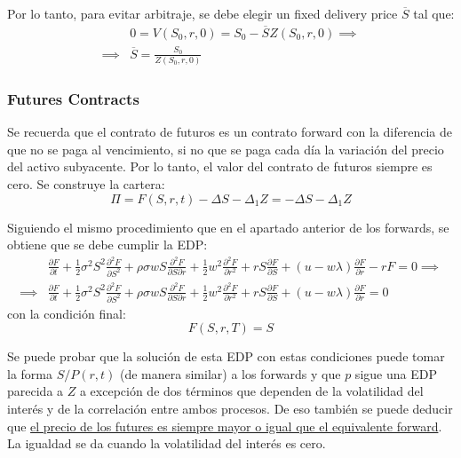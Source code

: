 Por lo tanto, para evitar arbitraje, se debe elegir un fixed delivery price $\overline{S}$ tal que:
\begin{align*}
    &0 = V(S_0,r,0) = S_0 - \overline{S} Z(S_0,r,0) \implies \\
    \implies &\boxed{\overline{S} = \frac{S_0}{Z(S_0,r,0)}}
\end{align*}





\subsubsection{Futures Contracts}
Se recuerda que el contrato de futuros es un contrato forward con la diferencia de que no se paga al vencimiento, si no que se paga cada día la variación del precio del activo subyacente. Por lo tanto, el valor del contrato de futuros siempre es cero. Se construye la cartera:
\begin{equation*}
    \Pi = F(S,r,t) - \Delta S - \Delta_1 Z = - \Delta S - \Delta_1 Z
\end{equation*}

Siguiendo el mismo procedimiento que en el apartado anterior de los forwards, se obtiene que se debe cumplir la EDP:
\begin{align*}
    &\frac{\partial F}{\partial t} + \frac{1}{2} \sigma^2 S^2 \frac{\partial^2 F}{\partial S^2} + \rho\sigma w S \frac{\partial^2 F}{\partial S \partial r} + \frac{1}{2} w^2 \frac{\partial^2 F}{\partial r^2} + rS\frac{\partial F}{\partial S} + (u - w\lambda) \frac{\partial F}{\partial r} - rF = 0 \implies \\
    \implies &\boxed{\frac{\partial F}{\partial t} + \frac{1}{2} \sigma^2 S^2 \frac{\partial^2 F}{\partial S^2} + \rho\sigma w S \frac{\partial^2 F}{\partial S \partial r} + \frac{1}{2} w^2 \frac{\partial^2 F}{\partial r^2} + rS\frac{\partial F}{\partial S} + (u - w\lambda) \frac{\partial F}{\partial r} = 0}
\end{align*}
con la condición final:
\begin{equation*}
    F(S,r,T) = S
\end{equation*}



Se puede probar que la solución de esta EDP con estas condiciones puede tomar la forma $S/P(r,t)$ (de manera similar) a los forwards y que $p$ sigue una EDP parecida a $Z$ a excepción de dos términos que dependen de la volatilidad del interés y de la correlación entre ambos procesos. De eso también se puede deducir que \underline{el precio de los futures es siempre mayor o igual que el equivalente forward}. La igualdad se da cuando la volatilidad del interés es cero.







